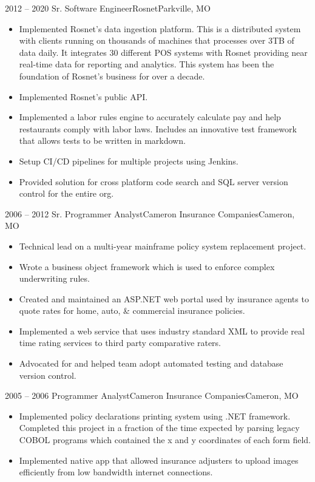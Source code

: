 \documentclass[11pt,letterpaper,final]{moderncv}
\begin{document}
	\cventry
{2012 -- 2020} {Sr. Software Engineer}{Rosnet}{Parkville, MO}{}{
		\begin{itemize}
			\item
				Implemented Rosnet's data ingestion platform. This is a
				distributed system with clients running on thousands of
				machines that processes over 3TB of data daily. It integrates 30
				different POS systems with Rosnet providing near real-time data
				for reporting and analytics. This system has been the foundation
				of Rosnet's business for over a decade.
			\item
				Implemented Rosnet's public API. 
			\item
				Implemented a labor rules engine to accurately calculate
				pay and help restaurants comply with labor laws.
				Includes an innovative test framework that allows tests
				to be written in markdown.
			\item
				Setup CI/CD pipelines for multiple projects using Jenkins.
			\item
				Provided solution for cross platform code search and SQL server
				version control for the entire org.
		\end{itemize}
}
\linebreak

	\cventry
{2006 -- 2012} {Sr. Programmer Analyst}{Cameron Insurance Companies}{Cameron, MO}{}{
		\begin{itemize}
			\item 
				Technical lead on a multi-year mainframe policy system
				replacement project.
			\item 
				Wrote a business object framework which is used to enforce
				complex underwriting rules.
			\item 
				Created and maintained an ASP.NET web portal used by
				insurance agents to quote rates for home, auto, \&
				commercial insurance policies.
			\item 
				Implemented a web service that uses industry standard XML to
				provide real time rating services to third party comparative
				raters.
			\item
				Advocated for and helped team adopt automated testing
				and database version control.
		\end{itemize}
}
\linebreak

	\cventry
{2005 -- 2006} {Programmer Analyst}{Cameron Insurance Companies}{Cameron, MO}{}{
		\begin{itemize}
			\item
				Implemented policy declarations printing system using .NET framework.
				Completed this project in a fraction of the time expected by
				parsing legacy COBOL programs which contained the x and y
				coordinates of each form field.
			\item
				Implemented native app that allowed insurance adjusters
				to upload images efficiently from low bandwidth internet
				connections.
		\end{itemize}
}
\linebreak
\end{document}
